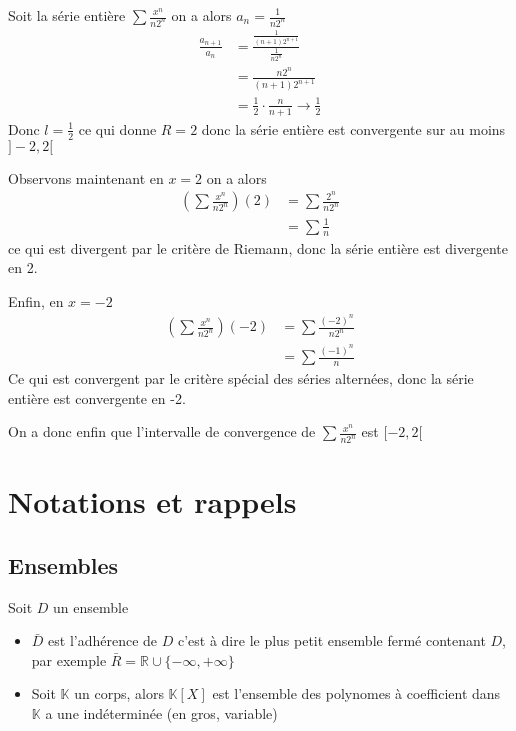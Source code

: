\documentclass[11pt,colorlinks]{book}
\theoremstyle{mytheoremstyle}
\theoremstyle{mytheoremstyle}
\theoremstyle{mytheoremstyle}
\theoremstyle{mytheoremstyle}
\theoremstyle{mytheoremstyle}
\theoremstyle{mytheoremstyle}
\theoremstyle{mytheoremstyle}
\theoremstyle{mytheoremstyle}
\theoremstyle{myproblemstyle}
\def\mbb#1{\mathbb{#1}}
\def\bR{\mbb{R}}
\def\bK{\mbb{K}}
\begin{document}
\begin{ex}
  Soit la série entière $\sum \frac{x^n}{n2^n}$ on a alors $a_n = \frac{1}{n2^n}$
  \begin{align*}
    \frac{a_{n+1}}{a_n} &= \frac{\frac{1}{(n+1)2^{n+1}}}{\frac{1}{n2^n}} \\ 
    &= \frac{n2^n}{(n+1)2^{n+1}} \\
    &= \frac{1}{2} \cdot \frac{n}{n+1}
    \to \frac{1}{2}
  \end{align*}
  Donc $l = \frac{1}{2}$ ce qui donne $R = 2$ donc la série entière est convergente sur au moins $]-2,2[$\newline

  Observons maintenant en $x=2$ on a alors 
  \begin{align*}
    \left(\sum \frac{x^n}{n2^n}\right)(2) &= \sum \frac{2^n}{n2^n} \\ 
    &= \sum \frac{1}{n}
  \end{align*}
  ce qui est divergent par le critère de Riemann, donc la série entière est divergente en 2.\newline

  Enfin, en $x=-2$
  \begin{align*}
    \left(\sum \frac{x^n}{n2^n}\right)(-2) &= \sum \frac{(-2)^n}{n2^n} \\ 
    &= \sum \frac{(-1)^n}{n}
  \end{align*}
  Ce qui est convergent par le critère spécial des séries alternées, donc la série entière est convergente en -2.\newline


  On a donc enfin que l'intervalle de convergence de $\sum \frac{x^n}{n2^n}$ est $[-2,2[$
\end{ex}

\chapter{Notations et rappels}
\section{Ensembles}
\begin{rmq}
  Soit $D$ un ensemble
  \begin{itemize}
    \item $\bar{D}$ est l'adhérence de $D$ c'est à dire le plus 
    petit ensemble fermé contenant $D$, par exemple $\bar{R} = \bR \cup \{-\infty,+\infty\}$
    \item Soit $\bK$ un corps, alors $\bK[X]$ est l'ensemble des polynomes 
    à coefficient dans $\bK$ a une indéterminée (en gros, variable)
  \end{itemize}
\end{rmq}
\end{document}
